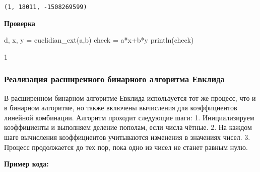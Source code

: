\documentclass[
]{article}
\newenvironment{Shaded}{}{}
\newcommand{\FloatTok}[1]{\textcolor[rgb]{0.25,0.63,0.44}{#1}}
\newcommand{\FunctionTok}[1]{\textcolor[rgb]{0.02,0.16,0.49}{#1}}
\newcommand{\NormalTok}[1]{#1}
\newcommand{\OperatorTok}[1]{\textcolor[rgb]{0.40,0.40,0.40}{#1}}
\begin{document}
\begin{verbatim}
(1, 18011, -1508269599)
\end{verbatim}

\textbf{Проверка}

\begin{Shaded}
\begin{Highlighting}[]
\NormalTok{d, x, y }\OperatorTok{=} \FunctionTok{euclidian\_ext}\NormalTok{(a,b)}
\NormalTok{check }\OperatorTok{=}\NormalTok{ a}\OperatorTok{*}\NormalTok{x}\OperatorTok{+}\NormalTok{b}\OperatorTok{*}\NormalTok{y}
\FunctionTok{println}\NormalTok{(check)}


    \FloatTok{1}
\end{Highlighting}
\end{Shaded}

\subsubsection{Реализация расширенного бинарного алгоритма
Евклида}\label{ux440ux435ux430ux43bux438ux437ux430ux446ux438ux44f-ux440ux430ux441ux448ux438ux440ux435ux43dux43dux43eux433ux43e-ux431ux438ux43dux430ux440ux43dux43eux433ux43e-ux430ux43bux433ux43eux440ux438ux442ux43cux430-ux435ux432ux43aux43bux438ux434ux430}

В расширенном бинарном алгоритме Евклида используется тот же процесс,
что и в бинарном алгоритме, но также включены вычисления для
коэффициентов линейной комбинации. Алгоритм проходит следующие шаги: 1.
Инициализируем коэффициенты и выполняем деление пополам, если числа
чётные. 2. На каждом шаге вычисления коэффициентов учитываются изменения
в значениях чисел. 3. Процесс продолжается до тех пор, пока одно из
чисел не станет равным нулю.

\textbf{Пример кода:}
\end{document}
